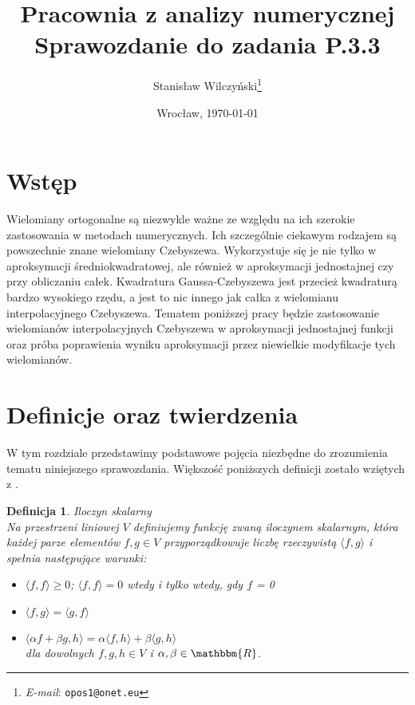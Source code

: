 \documentclass[12pt,wide]{mwart}
\date{Wrocław, \today}
\title{\LARGE\textbf{Pracownia z analizy numerycznej}\\ Sprawozdanie do zadania \textbf{P.3.3}}
\author{Stanisław Wilczyński\thanks{\textit{E-mail}: \texttt{opos1@onet.eu}}}
\newtheorem{defin}{Definicja}
\begin{document}
\maketitle                %
\thispagestyle{empty}     %
\tableofcontents          %

\section{Wstęp}
Wielomiany ortogonalne są niezwykle ważne ze względu na ich szerokie zastosowania w metodach numerycznych. Ich szczególnie ciekawym rodzajem są powszechnie znane wielomiany Czebyszewa. Wykorzystuje się je nie tylko w aproksymacji średniokwadratowej, ale również w aproksymacji jednostajnej czy przy obliczaniu całek. Kwadratura Gaussa-Czebyszewa jest przecież kwadraturą bardzo wysokiego rzędu, a jest to nic innego jak całka z wielomianu interpolacyjnego Czebyszewa. Tematem poniższej pracy będzie zastosowanie wielomianów interpolacyjnych Czebyszewa w aproksymacji jednostajnej funkcji oraz próba poprawienia wyniku aproksymacji przez niewielkie modyfikacje tych wielomianów.


\section{Definicje oraz twierdzenia}
W tym rozdziale przedstawimy podstawowe pojęcia niezbędne do zrozumienia tematu niniejszego sprawozdania. Większość poniższych definicji zostało wziętych z \cite{JMJ}.

\begin{defin}{Iloczyn skalarny}\\
Na przestrzeni liniowej $V$ definiujemy funkcję zwaną iloczynem skalarnym, która każdej parze elementów $f,g \in V$ przyporządkowuje liczbę rzeczywistą $\langle f,g \rangle$ i spełnia następujące warunki:
\begin{itemize}
	\item $\langle f,f \rangle \geq 0$; $\langle f,f \rangle = 0$ wtedy i tylko wtedy, gdy $f$ = 0
	\item $\langle f,g \rangle = \langle g,f \rangle$
	\item $\langle \alpha f + \beta g ,h \rangle = \alpha\langle f,h \rangle + \beta\langle g,h \rangle$\\
	dla dowolnych $f,g,h \in V$ i $\alpha,\beta \in \mathbbm{R}$.
\end{itemize} 
\end{defin}
\end{document}
